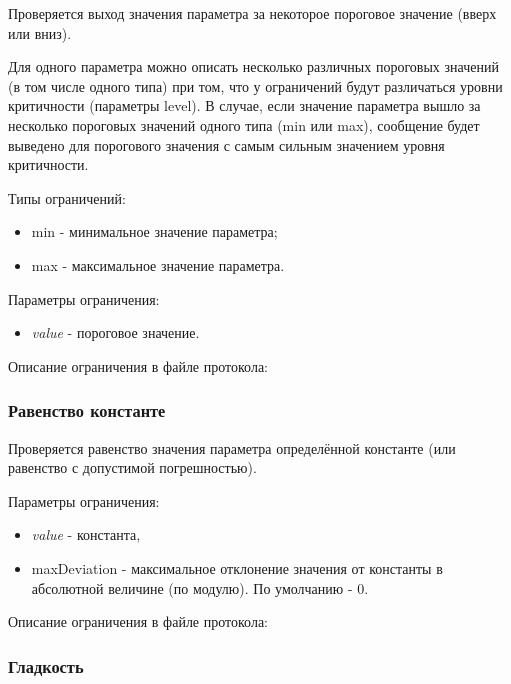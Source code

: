 Проверяется выход значения параметра за некоторое пороговое значение (вверх или 
вниз).

Для одного параметра можно описать несколько различных пороговых значений (в 
том числе одного типа) при том, что у ограничений будут различаться уровни 
критичности (параметры level). В случае, если значение параметра вышло за 
несколько пороговых значений одного типа (min или max), сообщение будет 
выведено для порогового значения с самым сильным значением уровня критичности.

Типы ограничений:

\begin{itemize}
 \item min - минимальное значение параметра;
 \item max - максимальное значение параметра.
\end{itemize}

Параметры ограничения:

\begin{itemize}
 \item \textit{value} - пороговое значение.
\end{itemize}

Описание ограничения в файле протокола:




\subsubsection{Равенство константе}

Проверяется равенство значения параметра определённой константе (или равенство 
с допустимой погрешностью).

Параметры ограничения:
\begin{itemize}
 \item \textit{value} - константа,
 \item maxDeviation - максимальное отклонение значения от константы в 
абсолютной величине (по модулю). По умолчанию - 0.
\end{itemize}

Описание ограничения в файле протокола:




\subsubsection{Гладкость}

